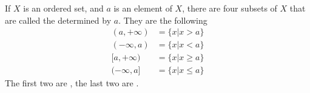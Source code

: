 \begin{defn}\label{defn:rays}
If $X$ is an ordered set, and $a$ is an element of $X$, there are
four subsets of $X$ that are called the  determined
by $a$. They are the following
\begin{subequations}
\begin{align}
(a,+\infty) &= \{x|x>a\}\\
(-\infty,a) &= \{x|x<a\}\\
[a,+\infty) &= \{x|x\geq a\}\\
(-\infty,a] &= \{x|x\leq a\}
\end{align}
\end{subequations}
The first two are , the last two are
.
\end{defn}
